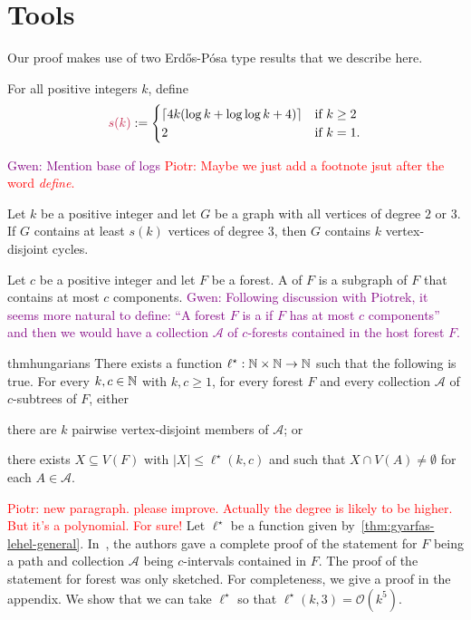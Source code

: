 \documentclass{patmorin}
\newcommand{\gwen}[1]{\textcolor{Purple}{Gwen: #1}}
\newcommand{\piotr}[1]{\textcolor{red}{Piotr: #1}}
\newcommand{\Oh}{\mathcal{O}}
\begin{document}
\section{Tools}

Our proof makes use of two Erd\H{o}s-Pósa type results that we describe here.

For all positive integers $k$, define
\[
\mathdefin{s(k)}:=\begin{cases}
\lceil 4k(\log k + \log\log k +4)\rceil&\textrm{if $k\geq2$}\\
2&\textrm{if $k=1$.}
\end{cases}
\]

\gwen{Mention base of logs}
\piotr{Maybe we just add a footnote jsut after the word \emph{define}.}

\begin{thm}
\label{thm:simonovits}
Let $k$ be a positive integer and
let $G$ be a graph with all vertices of degree $2$ or $3$.
If $G$ contains at least $s(k)$ vertices of degree $3$, then
$G$ contains $k$ vertex-disjoint cycles.
\end{thm}

Let $c$ be a positive integer and let $F$ be a forest. 
A  of $F$ is a subgraph of $F$ that contains at most $c$ components. 
\gwen{Following discussion with Piotrek, it seems more natural to define: ``A forest $F$ is a \mathdefin{$c$-forest} if $F$ has at most $c$ components'' and then we would have  a collection $\mathcal{A}$ of $c$-forests contained in the host forest $F$.}

\begin{restatable}
{thm}{hungarians}\label{thm:gyarfas-lehel-general}
   There exists a function $\ell^\star:\mathbb{N}\times\mathbb{N}\to\mathbb{N}$ such that the following is true. For every $k,c\in\mathbb{N}$ with $k,c\geq1$, for every forest $F$ and 
    every collection $\mathcal{A}$ of $c$-subtrees of $F$, either
   \begin{tightenum}%
     \item there are $k$ pairwise vertex-disjoint members of $\mathcal{A}$; or
     \item there exists $X \subseteq V(F)$ with 
     $|X|\leq \ell^\star(k,c)$ and such that 
     $X\cap V(A)\neq\emptyset$ for each $A\in\mathcal{A}$. 
   \end{tightenum}
\end{restatable}
\piotr{new paragraph. please improve. Actually the degree is likely to be higher. But it's a polynomial. For sure!}
Let $\ell^\star$ be a function given by~\cref{thm:gyarfas-lehel-general}. In~\cite{gyarfas.lehel:helly}, the authors gave a complete proof of the statement for $F$ being a path and collection $\mathcal{A}$ being $c$-intervals contained in $F$. The proof of the statement for forest was only sketched. For completeness, we give a proof in the appendix. 
We show that we can take $\ell^\star$ so that $\ell^\star(k,3)=\Oh(k^5)$.
\end{document}
